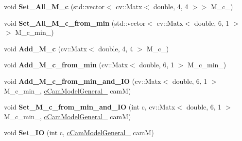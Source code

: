 \begin{DoxyCompactItemize}
\item 
void {\bfseries Set\+\_\+\+All\+\_\+\+M\+\_\+c} (std\+::vector$<$ cv\+::\+Matx$<$ double, 4, 4 $>$$>$ M\+\_\+c\+\_\+)\hypertarget{classMultiColSLAM_1_1cMultiCamSys___a8aed2953b9921d66fb483286307f25a5}{}\label{classMultiColSLAM_1_1cMultiCamSys___a8aed2953b9921d66fb483286307f25a5}

\item 
void {\bfseries Set\+\_\+\+All\+\_\+\+M\+\_\+c\+\_\+from\+\_\+min} (std\+::vector$<$ cv\+::\+Matx$<$ double, 6, 1 $>$$>$ M\+\_\+c\+\_\+min\+\_\+)\hypertarget{classMultiColSLAM_1_1cMultiCamSys___aa65265786747902d0dc2c631c12f54ca}{}\label{classMultiColSLAM_1_1cMultiCamSys___aa65265786747902d0dc2c631c12f54ca}

\item 
void {\bfseries Add\+\_\+\+M\+\_\+c} (cv\+::\+Matx$<$ double, 4, 4 $>$ M\+\_\+c\+\_\+)\hypertarget{classMultiColSLAM_1_1cMultiCamSys___af7af083b06c487bb6383d77ea09b41ba}{}\label{classMultiColSLAM_1_1cMultiCamSys___af7af083b06c487bb6383d77ea09b41ba}

\item 
void {\bfseries Add\+\_\+\+M\+\_\+c\+\_\+from\+\_\+min} (cv\+::\+Matx$<$ double, 6, 1 $>$ M\+\_\+c\+\_\+min\+\_\+)\hypertarget{classMultiColSLAM_1_1cMultiCamSys___aef2b4de35eccc1ed3948568efa3cdada}{}\label{classMultiColSLAM_1_1cMultiCamSys___aef2b4de35eccc1ed3948568efa3cdada}

\item 
void {\bfseries Add\+\_\+\+M\+\_\+c\+\_\+from\+\_\+min\+\_\+and\+\_\+\+IO} (cv\+::\+Matx$<$ double, 6, 1 $>$ M\+\_\+c\+\_\+min\+\_\+, \hyperlink{classMultiColSLAM_1_1cCamModelGeneral__}{c\+Cam\+Model\+General\+\_\+} camM)\hypertarget{classMultiColSLAM_1_1cMultiCamSys___a0dff9ed09343e4b39441683477709e2b}{}\label{classMultiColSLAM_1_1cMultiCamSys___a0dff9ed09343e4b39441683477709e2b}

\item 
void {\bfseries Set\+\_\+\+M\+\_\+c\+\_\+from\+\_\+min\+\_\+and\+\_\+\+IO} (int c, cv\+::\+Matx$<$ double, 6, 1 $>$ M\+\_\+c\+\_\+min\+\_\+, \hyperlink{classMultiColSLAM_1_1cCamModelGeneral__}{c\+Cam\+Model\+General\+\_\+} camM)\hypertarget{classMultiColSLAM_1_1cMultiCamSys___a70f5bf5167933561ffde33350312509b}{}\label{classMultiColSLAM_1_1cMultiCamSys___a70f5bf5167933561ffde33350312509b}

\item 
void {\bfseries Set\+\_\+\+IO} (int c, \hyperlink{classMultiColSLAM_1_1cCamModelGeneral__}{c\+Cam\+Model\+General\+\_\+} camM)\hypertarget{classMultiColSLAM_1_1cMultiCamSys___a50b9a082a2aaf50d1113a32c06e02fe7}{}\label{classMultiColSLAM_1_1cMultiCamSys___a50b9a082a2aaf50d1113a32c06e02fe7}


\end{DoxyCompactItemize}
